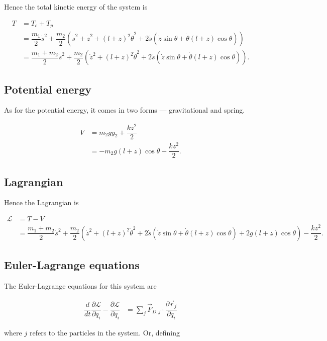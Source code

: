 \documentclass[12pt,a4paper,portrait]{article}
\newcommand{\lag}{\mathcal{L}}
\begin{document}
Hence the total kinetic energy of the system is

\begin{align*}
	T &= T_c + T_p \\
	&= \dfrac{m_1}{2}\dot{s}^2 + \dfrac{m_2}{2} \left(\dot{s}^2 + \dot{z}^2 + (l+z)^2\dot{\theta}^2 + 2\dot{s}(\dot{z}\sin{\theta} + \dot{\theta}(l+z)\cos{\theta})\right) \\
	&= \dfrac{m_1+m_2}{2} \dot{s}^2 + \dfrac{m_2}{2}\left(\dot{z}^2 + (l+z)^2\dot{\theta}^2 + 2\dot{s}(\dot{z}\sin{\theta} + \dot{\theta}(l+z)\cos{\theta})\right).
\end{align*}

\subsection{Potential energy}
As for the potential energy, it comes in two forms --- gravitational and spring. 

\begin{align*}
	V &= m_2 g y_2 + \dfrac{kz^2}{2}\\
	&= -m_2g(l+z)\cos{\theta} + \dfrac{kz^2}{2}.
\end{align*}

\subsection{Lagrangian}
Hence the Lagrangian is

\begin{align*}
	\lag &= T - V \\
	&= \dfrac{m_1+m_2}{2} \dot{s}^2 + \dfrac{m_2}{2}\left(\dot{z}^2 + (l+z)^2\dot{\theta}^2 + 2\dot{s}(\dot{z}\sin{\theta} + \dot{\theta}(l+z)\cos{\theta})+2g(l+z)\cos{\theta}\right) - \dfrac{kz^2}{2}.
\end{align*}

\subsection{Euler-Lagrange equations}
The Euler-Lagrange equations for this system are

\begin{align*}
	\dfrac{d}{dt}\dfrac{\partial \lag}{\partial \dot{q}_i} - \dfrac{\partial \lag}{\partial q_i} &= \sum_{j} \vec{F}_{D, j} \cdot \dfrac{\partial \vec{r}_{j}}{\partial q_i}
\end{align*}

where $j$ refers to the particles in the system. Or, defining
\end{document}
